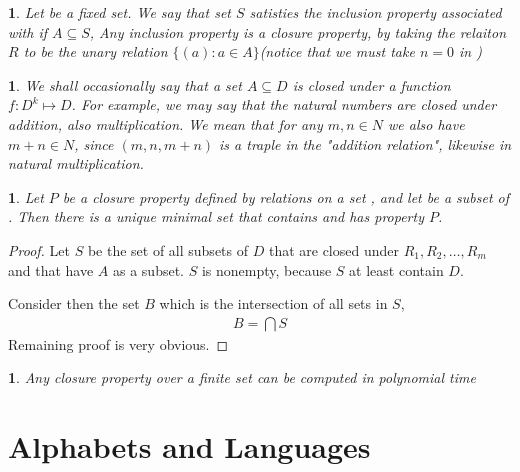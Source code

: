 \newtheorem{inclusion_property}[example_root]{\example}
\begin{inclusion_property}
Let \ua be a fixed set. We say that set $S$ satisties the inclusion property associated
with \ua if $A\subseteq S$, Any inclusion property is a closure property, 
by taking the relaiton $R$ to be the unary relation $\{(a): a\in A\}$(notice that we must take $n=0$ in )
\end{inclusion_property}

\newtheorem{natural_closure_property}[example_root]{\example}
\begin{natural_closure_property}
We shall occasionally say that a set $A\subseteq D$ is closed under a function 
$f: D^k\mapsto D$. For example, we may say that the natural numbers are closed under 
addition, also multiplication. We mean that for any $m, n\in N$ we also 
have $m+n\in N$, since $(m, n, m+n)$ is a traple in the "addition relation", likewise in 
natural multiplication.
\end{natural_closure_property}

\newtheorem{minimal_property_set}[theorem_root]{\theorem}
\begin{minimal_property_set}
Let $P$ be a closure property defined by relations on a set \ud,
and let \ua be a subset of \ud. Then there is a unique minimal set \ub that
contains \ua and has property $P$.
\end{minimal_property_set}

\begin{proof}
        Let $S$ be the set of all subsets of $D$ that are closed under $R_1, R_2, \ldots, R_m$
        and that have $A$ as a subset. $S$ is nonempty, because $S$ at least contain $D$.

        Consider then the set $B$ which is the intersection of all sets in $S$,
        \begin{align*}
            B = \bigcap S
        \end{align*}
        Remaining proof is very obvious.
\end{proof}

\newtheorem{closure_computation_is_polynomial}[theorem_root]{\theorem}
\begin{closure_computation_is_polynomial}
Any closure property over a finite set can be computed in polynomial time
\end{closure_computation_is_polynomial}

\section{Alphabets and Languages}

